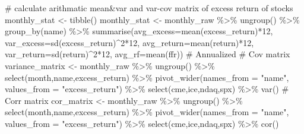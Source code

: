 \documentclass[
  letterpaper,
  DIV=11,
  numbers=noendperiod]{scrreprt}
\newenvironment{Shaded}{\begin{snugshade}}{\end{snugshade}}
\newcommand{\AttributeTok}[1]{\textcolor[rgb]{0.40,0.45,0.13}{#1}}
\newcommand{\CommentTok}[1]{\textcolor[rgb]{0.37,0.37,0.37}{#1}}
\newcommand{\DecValTok}[1]{\textcolor[rgb]{0.68,0.00,0.00}{#1}}
\newcommand{\FunctionTok}[1]{\textcolor[rgb]{0.28,0.35,0.67}{#1}}
\newcommand{\NormalTok}[1]{\textcolor[rgb]{0.00,0.23,0.31}{#1}}
\newcommand{\OtherTok}[1]{\textcolor[rgb]{0.00,0.23,0.31}{#1}}
\newcommand{\SpecialCharTok}[1]{\textcolor[rgb]{0.37,0.37,0.37}{#1}}
\newcommand{\StringTok}[1]{\textcolor[rgb]{0.13,0.47,0.30}{#1}}
\begin{document}
\begin{Shaded}
\begin{Highlighting}[]
\CommentTok{\# calculate arithmatic mean\&var and var{-}cov matrix of excess return of stocks}
\NormalTok{monthly\_stat }\OtherTok{\textless{}{-}} \FunctionTok{tibble}\NormalTok{()}
\NormalTok{monthly\_stat }\OtherTok{\textless{}{-}}\NormalTok{ monthly\_raw }\SpecialCharTok{\%\textgreater{}\%} 
  \FunctionTok{ungroup}\NormalTok{() }\SpecialCharTok{\%\textgreater{}\%} 
  \FunctionTok{group\_by}\NormalTok{(name) }\SpecialCharTok{\%\textgreater{}\%} 
  \FunctionTok{summarise}\NormalTok{(}\AttributeTok{avg\_excess=}\FunctionTok{mean}\NormalTok{(excess\_return)}\SpecialCharTok{*}\DecValTok{12}\NormalTok{,}
            \AttributeTok{var\_excess=}\FunctionTok{sd}\NormalTok{(excess\_return)}\SpecialCharTok{\^{}}\DecValTok{2}\SpecialCharTok{*}\DecValTok{12}\NormalTok{,}
            \AttributeTok{avg\_return=}\FunctionTok{mean}\NormalTok{(return)}\SpecialCharTok{*}\DecValTok{12}\NormalTok{,}
            \AttributeTok{var\_return=}\FunctionTok{sd}\NormalTok{(return)}\SpecialCharTok{\^{}}\DecValTok{2}\SpecialCharTok{*}\DecValTok{12}\NormalTok{,}
            \AttributeTok{avg\_rf=}\FunctionTok{mean}\NormalTok{(ffr)) }\CommentTok{\# Annualized}
\CommentTok{\# Cov matrix}
\NormalTok{variance\_matrix }\OtherTok{\textless{}{-}}\NormalTok{ monthly\_raw }\SpecialCharTok{\%\textgreater{}\%} 
  \FunctionTok{ungroup}\NormalTok{() }\SpecialCharTok{\%\textgreater{}\%}
  \FunctionTok{select}\NormalTok{(month,name,excess\_return) }\SpecialCharTok{\%\textgreater{}\%} 
  \FunctionTok{pivot\_wider}\NormalTok{(}\AttributeTok{names\_from =} \StringTok{"name"}\NormalTok{, }\AttributeTok{values\_from =} \StringTok{"excess\_return"}\NormalTok{) }\SpecialCharTok{\%\textgreater{}\%} 
  \FunctionTok{select}\NormalTok{(cme,ice,ndaq,spx) }\SpecialCharTok{\%\textgreater{}\%} 
  \FunctionTok{var}\NormalTok{()}
\CommentTok{\# Corr matrix}
\NormalTok{cor\_matrix }\OtherTok{\textless{}{-}}\NormalTok{ monthly\_raw }\SpecialCharTok{\%\textgreater{}\%} 
  \FunctionTok{ungroup}\NormalTok{() }\SpecialCharTok{\%\textgreater{}\%}
  \FunctionTok{select}\NormalTok{(month,name,excess\_return) }\SpecialCharTok{\%\textgreater{}\%} 
  \FunctionTok{pivot\_wider}\NormalTok{(}\AttributeTok{names\_from =} \StringTok{"name"}\NormalTok{, }\AttributeTok{values\_from =} \StringTok{"excess\_return"}\NormalTok{) }\SpecialCharTok{\%\textgreater{}\%} 
  \FunctionTok{select}\NormalTok{(cme,ice,ndaq,spx) }\SpecialCharTok{\%\textgreater{}\%} 
  \FunctionTok{cor}\NormalTok{()}
\end{Highlighting}
\end{Shaded}
\end{document}
